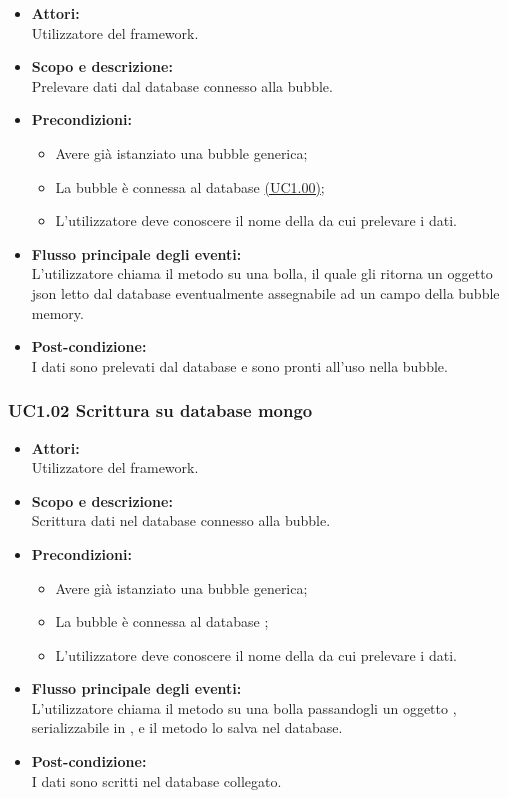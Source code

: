 \begin{itemize}
	\item \textbf{Attori:}
	\\Utilizzatore del framework.
	\item \textbf{Scopo e descrizione:} 
	\\Prelevare dati dal database connesso alla bubble.
	\item \textbf{Precondizioni:}
	\begin{itemize}
		\item Avere già istanziato una bubble generica;
		\item La bubble è connessa al database  \hyperref[UC1.00]{(UC1.00)};
		\item L’utilizzatore deve conoscere il nome della  da cui prelevare i dati.
	\end{itemize}
	\item \textbf{Flusso principale degli eventi:}
	\\L’utilizzatore chiama il metodo su una bolla, il quale gli ritorna un oggetto json letto dal database eventualmente assegnabile ad un campo della bubble memory.
	\item \textbf{Post-condizione:}
	\\I dati sono prelevati dal database e sono pronti all’uso nella bubble.
\end{itemize}

\subsubsection{UC1.02 Scrittura su database mongo} \label{UC1.02}

\begin{itemize}
\item \textbf{Attori:}
\\Utilizzatore del framework.
\item \textbf{Scopo e descrizione:} 
\\Scrittura dati nel database connesso alla bubble.
\item \textbf{Precondizioni:}
\begin{itemize}
	\item Avere già istanziato una bubble generica;
	\item La bubble è connessa al database ;
	\item L’utilizzatore deve conoscere il nome della  da cui prelevare i dati.
\end{itemize}
\item \textbf{Flusso principale degli eventi:}
\\L’utilizzatore chiama il metodo su una bolla passandogli un oggetto , serializzabile in , e il metodo lo salva nel database.
\item \textbf{Post-condizione:}
\\I dati sono scritti nel database collegato.
\end{itemize}

